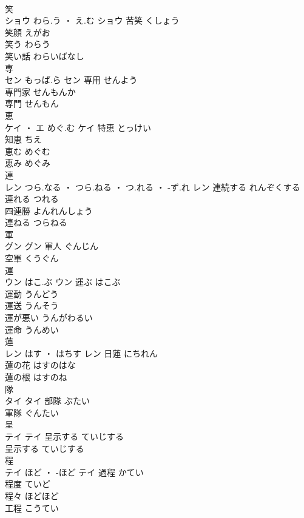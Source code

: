 \documentclass[8pt]{extreport}
\begin{document}
\begin{CJK}{UTF8}{min}
\\	笑	
\\	ショウ	わら.う ・ え.む	ショウ	苦笑	くしょう	
\\	笑顔	えがお	
\\	笑う	わらう	
\\	笑い話	わらいばなし	
\\	専	
\\	セン	もっぱ.ら	セン	専用	せんよう	
\\	専門家	せんもんか	
\\	専門	せんもん	
\\	恵	
\\	ケイ ・ エ	めぐ.む	ケイ	特恵	とっけい	
\\	知恵	ちえ	
\\	恵む	めぐむ	
\\	恵み	めぐみ	
\\	連	
\\	レン	つら.なる ・ つら.ねる ・ つ.れる ・ -ず.れ	レン	連続する	れんぞくする	
\\	連れる	つれる	
\\	四連勝	よんれんしょう	
\\	連ねる	つらねる	
\\	軍	
\\	グン		グン	軍人	ぐんじん	
\\	空軍	くうぐん	
\\	運	
\\	ウン	はこ.ぶ	ウン	運ぶ	はこぶ	
\\	運動	うんどう	
\\	運送	うんそう	
\\	運が悪い	うんがわるい	
\\	運命	うんめい	
\\	蓮	
\\	レン	はす ・ はちす	レン	日蓮	にちれん	
\\	蓮の花	はすのはな	
\\	蓮の根	はすのね	
\\	隊	
\\	タイ		タイ	部隊	ぶたい	
\\	軍隊	ぐんたい	
\\	呈	
\\	テイ		テイ	呈示する	ていじする	
\\	呈示する	ていじする	
\\	程	
\\	テイ	ほど ・ -ほど	テイ	過程	かてい	
\\	程度	ていど	
\\	程々	ほどほど	
\\	工程	こうてい	

\end{CJK}
\end{document}
